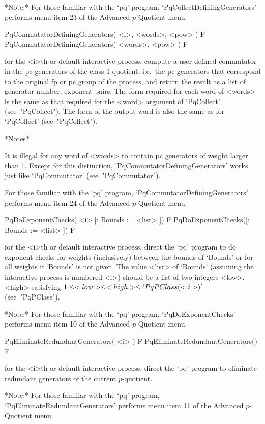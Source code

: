 *Note:*
For those familiar with the  `pq'  program,  `PqCollectDefiningGenerators'
performs menu item 23 of the Advanced $p$-Quotient menu.

\>PqCommutatorDefiningGenerators( <i>, <words>, <pow> ) F
\>PqCommutatorDefiningGenerators( <words>, <pow> ) F

for  the  <i>th  or  default  interactive  {\ANUPQ}  process,  compute  a
user-defined commutator in the pc generators of  the  class  1  quotient,
i.e.~the pc generators that correspond to the original fp or pc group  of
the process, and return  the  result  as  a  list  of  generator  number,
exponent pairs. The form required for each word of <words> is the same as
that required for the <word> argument of  `PqCollect'  (see~"PqCollect").
The form of  the  output  word  is  also  the  same  as  for  `PqCollect'
(see~"PqCollect").

\goodbreak%
*Notes*

It is illegal for any word of <words> to contain pc generators of  weight
larger      than      1.      Except      for      this      distinction,
`PqCommutatorDefiningGenerators'   works   just    like    `PqCommutator'
(see~"PqCommutator").

For those familiar with the `pq' program, `PqCommutatorDefiningGenerators'
performs menu item 24 of the Advanced $p$-Quotient menu.

\>PqDoExponentChecks( <i> [: Bounds := <list> ]) F
\>PqDoExponentChecks([: Bounds := <list> ]) F

for the <i>th or default interactive {\ANUPQ} process, direct  the  `pq'
program to do exponent checks for weights (inclusively) between the bounds
of `Bounds' or for all weights if `Bounds' is not given. The value <list>
of `Bounds' (assuming the interactive process is numbered <i>) should  be
a list of  two  integers  <low>,  <high>  satisfying  $1  \le  <low>  \le
<high> \le `PqPClass(<i>)'$ (see~"PqPClass").

*Note:*
For those familiar with the `pq'  program,  `PqDoExponentChecks'  performs
menu item 10 of the Advanced $p$-Quotient menu.

\>PqEliminateRedundantGenerators( <i> ) F
\>PqEliminateRedundantGenerators() F

for the <i>th or default interactive {\ANUPQ} process, direct  the  `pq'
program to eliminate redundant generators of the current $p$-quotient.

*Note:* 
For those familiar with the `pq' program, `PqEliminateRedundantGenerators'
performs menu item 11 of the Advanced $p$-Quotient menu.

